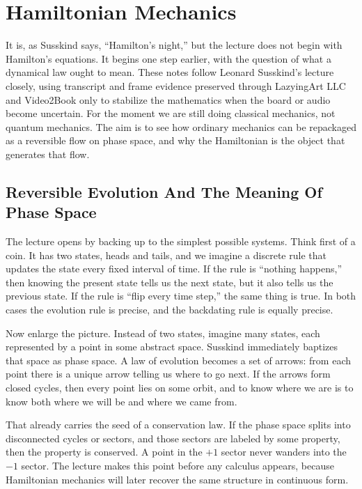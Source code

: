 \chapter{Hamiltonian Mechanics}

It is, as Susskind says, ``Hamilton's night,'' but the lecture does not begin with Hamilton's equations. It begins one step earlier, with the question of what a dynamical law ought to mean. These notes follow Leonard Susskind's lecture closely, using transcript and frame evidence preserved through LazyingArt LLC and Video2Book only to stabilize the mathematics when the board or audio become uncertain. For the moment we are still doing classical mechanics, not quantum mechanics. The aim is to see how ordinary mechanics can be repackaged as a reversible flow on phase space, and why the Hamiltonian is the object that generates that flow.

\section{Reversible Evolution And The Meaning Of Phase Space}

The lecture opens by backing up to the simplest possible systems. Think first of a coin. It has two states, heads and tails, and we imagine a discrete rule that updates the state every fixed interval of time. If the rule is ``nothing happens,'' then knowing the present state tells us the next state, but it also tells us the previous state. If the rule is ``flip every time step,'' the same thing is true. In both cases the evolution rule is precise, and the backdating rule is equally precise.

Now enlarge the picture. Instead of two states, imagine many states, each represented by a point in some abstract space. Susskind immediately baptizes that space as phase space. A law of evolution becomes a set of arrows: from each point there is a unique arrow telling us where to go next. If the arrows form closed cycles, then every point lies on some orbit, and to know where we are is to know both where we will be and where we came from.

That already carries the seed of a conservation law. If the phase space splits into disconnected cycles or sectors, and those sectors are labeled by some property, then the property is conserved. A point in the \(+1\) sector never wanders into the \(-1\) sector. The lecture makes this point before any calculus appears, because Hamiltonian mechanics will later recover the same structure in continuous form.

